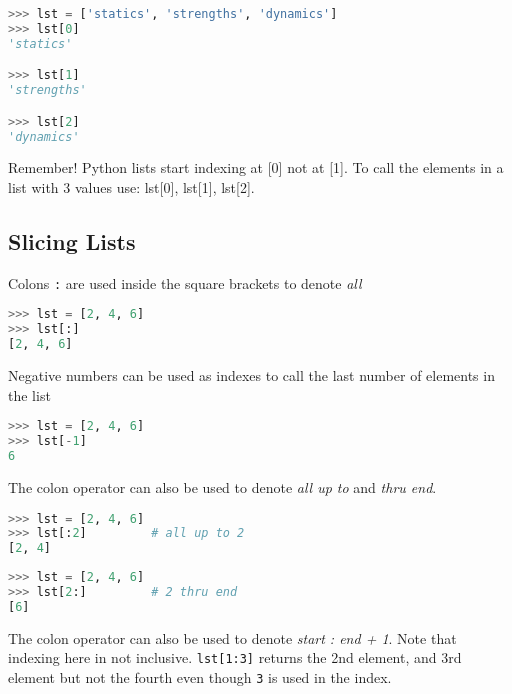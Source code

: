 \documentclass{book}
\newcommand{\passthrough}[1]{#1}
\begin{document}
\begin{lstlisting}[language=Python]
>>> lst = ['statics', 'strengths', 'dynamics']
>>> lst[0]
'statics'

>>> lst[1]
'strengths'

>>> lst[2]
'dynamics'
\end{lstlisting}
    




    
        Remember! Python lists start indexing at {[}0{]} not at {[}1{]}. To call
the elements in a list with 3 values use: lst{[}0{]}, lst{[}1{]},
lst{[}2{]}.
    




    
        \hypertarget{slicing-lists}{%
\subsection{Slicing Lists}\label{slicing-lists}}

Colons \passthrough{\lstinline!:!} are used inside the square brackets
to denote \emph{all}

\begin{lstlisting}[language=Python]
>>> lst = [2, 4, 6]
>>> lst[:]
[2, 4, 6]
\end{lstlisting}

Negative numbers can be used as indexes to call the last number of
elements in the list

\begin{lstlisting}[language=Python]
>>> lst = [2, 4, 6]
>>> lst[-1]
6
\end{lstlisting}

The colon operator can also be used to denote \emph{all up to} and
\emph{thru end}.

\begin{lstlisting}[language=Python]
>>> lst = [2, 4, 6]
>>> lst[:2]         # all up to 2
[2, 4]
\end{lstlisting}

\begin{lstlisting}[language=Python]
>>> lst = [2, 4, 6]
>>> lst[2:]         # 2 thru end
[6]
\end{lstlisting}

The colon operator can also be used to denote \emph{start : end + 1}.
Note that indexing here in not inclusive.
\passthrough{\lstinline!lst[1:3]!} returns the 2nd element, and 3rd
element but not the fourth even though \passthrough{\lstinline!3!} is
used in the index.
    
\end{document}
